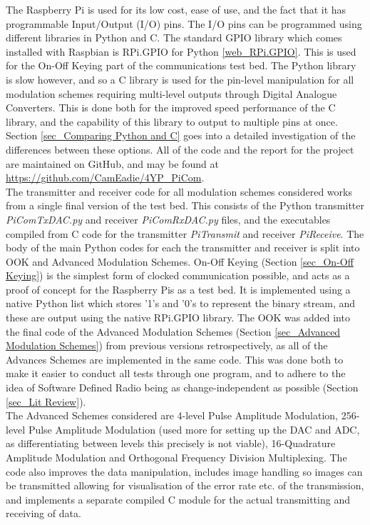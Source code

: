 \documentclass[../main.tex]{subfiles}
\begin{document}
The Raspberry Pi is used for its low cost, ease of use, and the fact that it has programmable Input/Output (I/O) pins.
The I/O pins can be programmed using different libraries in Python and C.
The standard GPIO library which comes installed with Raspbian is RPi.GPIO for Python \ref{web_RPi.GPIO}.
This is used for the On-Off Keying part of the communications test bed.
The Python library is slow however, and so a C library is used for the pin-level manipulation for all modulation schemes requiring multi-level outputs through Digital Analogue Converters.
This is done both for the improved speed performance of the C library, and the capability of this library to output to multiple pins at once.
Section \ref{sec_Comparing Python and C} goes into a detailed  investigation of the differences between these options.
All of the code and the report for the project are maintained on GitHub, and may be found at \url{https://github.com/CamEadie/4YP_PiCom}.\\

The transmitter and receiver code for all modulation schemes considered works from a single final version of the test bed.
This consists of the Python transmitter \textit{PiComTx\textunderscore DAC.py} and receiver \textit{PiComRx\textunderscore DAC.py} files, and the executables compiled from C code for the transmitter \textit{PiTransmit} and receiver \textit{PiReceive}.
The body of the main Python codes for each the transmitter and receiver is split into OOK and Advanced Modulation Schemes.
On-Off Keying (Section \ref{sec_On-Off Keying}) is the simplest form of clocked communication possible, and acts as a proof of concept for the Raspberry Pis as a test bed.
It is implemented using a native Python list which stores '1's and '0's to represent the binary stream, and these are output using the native RPi.GPIO library.
The OOK was added into the final code of the Advanced Modulation Schemes (Section \ref{sec_Advanced Modulation Schemes})  from previous versions retrospectively, as all of the Advances Schemes are implemented in the same code.
This was done both to make it easier to conduct all tests through one program, and to adhere to the idea of Software Defined Radio being as change-independent as possible (Section \ref{sec_Lit Review}).\\
The Advanced Schemes considered are 4-level Pulse Amplitude Modulation, 256-level Pulse Amplitude Modulation (used more for setting up the DAC and ADC, as differentiating between levels this precisely is not viable), 16-Quadrature Amplitude Modulation and Orthogonal Frequency Division Multiplexing.
The code also improves the data manipulation, includes image handling so images can be transmitted allowing for visualisation of the error rate etc. of the transmission, and implements a separate compiled C module for the actual transmitting and receiving of data.\\
\end{document}
